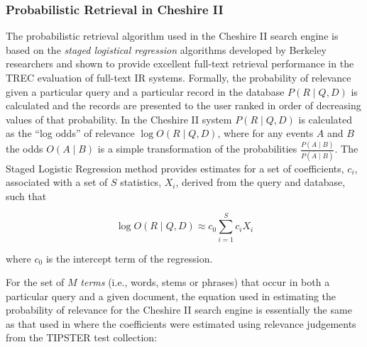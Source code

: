 \subsubsection{Probabilistic Retrieval in Cheshire II}

The probabilistic retrieval algorithm used in the Cheshire II search
engine is based on the {\em staged logistical regression} algorithms
developed by Berkeley researchers and shown to provide excellent
full-text retrieval performance in the TREC evaluation of full-text IR
systems\cite{SLR,TREC2,TREC3}.  Formally, the probability of relevance
given a particular query and a particular record in the database 
$P(R \mid Q, D)$ is calculated and the records are presented to the user ranked
in order of decreasing values of that probability.  In the Cheshire II
system $P(R \mid Q, D)$ is calculated as the ``log odds'' of relevance
$\log O(R \mid Q, D)$, where for any events $A$ and $B$ the odds $O(A
\mid B)$ is a simple transformation of the probabilities $\frac{P(A
\mid B)}{P(\overline{A} \mid B)}$. The Staged Logistic Regression
method provides estimates for a set of coefficients, $c_{i}$, associated
with a set of $S$ statistics, $X_{i}$, derived from the query and database,
such that

\begin{equation}
\log O(R \mid Q,D) \approx c_{0} \sum_{i=1}^{S} c_{i} X_{i}
\label{equ1}
\end{equation}

where $c_{0}$ is the intercept term of the regression.

For the set of $M$ {\em terms} (i.e., words, stems or phrases) that
occur in both a particular query and a given document, the equation
used in estimating the probability of relevance for the Cheshire II
search engine is essentially the same as that used in \cite{TREC2}
where the coefficients were estimated using relevance judgements from
the TIPSTER test collection:

